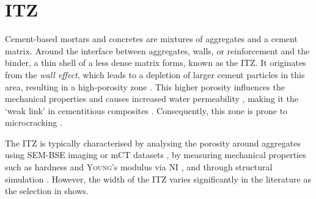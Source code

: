 \FloatBarrier
\section[Interfacial transition zone]{\Acl*{ITZ}}

Cement-based mortars and concretes are mixtures of aggregates and a cement matrix.
Around the interface between aggregates, walls, or reinforcement and the binder, a thin shell of a less dense matrix forms, known as the \ac{ITZ}.
It originates from the \textit{wall effect}, which leads to a depletion of larger cement particles in this area, resulting in a high-porosity zone \cite{gao.2014, torsaeter.2015}.
This higher porosity influences the mechanical properties \cite{zhu.2000,xiao.2013} and causes increased water permeability \cite{ye.2007}, making it the `weak link' in cementitious composites \cite{zhu.2000}.
Consequently, this zone is prone to microcracking \cite{ye.2007}.

The \ac{ITZ} is typically characterised by analysing the porosity around aggregates using \ac{SEM}-\ac{BSE} imaging \cite{gao.2014} or \ac{mCT} datasets \cite{lavrov.2017}, by measuring mechanical properties such as hardness and \textsc{Young}'s modulus via \ac{NI} \cite{zhu.2000,xiao.2013}, and through structural simulation \cite{ye.2007}.
However, the width of the \ac{ITZ} varies significantly in the literature as the selection in  shows.

